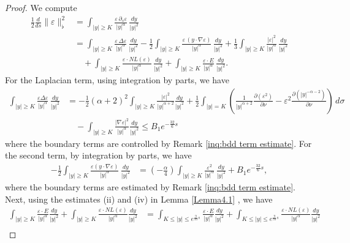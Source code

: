 \documentclass[11pt,reqno]{amsart}
\theoremstyle{definition}
\theoremstyle{bfremark}
\numberwithin{equation}{section}
\begin{document}
\begin{proof}
We compute
\begin{align*}
    \frac{1}{2}\frac{d}{ds}\|\varepsilon\|_{\flat}^2 &= \int_{|y| \geq K} \frac{\varepsilon\, \partial_s \varepsilon}{|y|^{\alpha}}\, \frac{dy}{|y|^2}\\
    &= \int_{|y| \geq K} \frac{\varepsilon\, \Delta \varepsilon}{|y|^{\alpha}}\, \frac{dy}{|y|^2} 
    - \frac{1}{2} \int_{|y| \geq K} \frac{\varepsilon\, (y \cdot \nabla \varepsilon)}{|y|^{\alpha}}\, \frac{dy}{|y|^2} 
    +\frac{1}{3} \int_{|y| \geq K} \frac{|\varepsilon|^2}{|y|^{\alpha}}\, \frac{dy}{|y|^2}\\
    & \quad+ \int_{|y| \geq K} \frac{\varepsilon \cdot NL(\varepsilon)}{|y|^{\alpha}}\, \frac{dy}{|y|^2}+\int_{|y| \geq K}\frac{ \varepsilon \cdot E}{|y|^{\alpha}}\,\frac{dy}{|y|^2}.
\end{align*}
For the Laplacian term, using integration by parts, we have
\begin{align*}
    \int_{|y| \geq K} \frac{\varepsilon \Delta \varepsilon}{|y|^{\alpha}}\, \frac{dy}{|y|^2} 
    &=-\frac{1}{2}(\alpha+2)^2\int_{|y| \geq K}\frac{|\varepsilon|^2}{|y|^{\alpha+2}}\frac{dy}{|y|^2}+\frac{1}{2}\int_{|y|=K}\left(\frac{1}{|y|^{\alpha+2}}\frac{\partial(\varepsilon^2)}{\partial \nu}-\varepsilon^2\frac{\partial(|y|^{-\alpha-2})}{\partial \nu}\right)\,d\sigma\\
    & \quad -\int_{|y| \geq K}\frac{|\nabla \varepsilon|^2}{|y|^{\alpha}}\frac{dy}{|y|^2} \leq B_1e^{-\frac{32}{6}s}
\end{align*}
where the boundary terms are controlled by Remark \ref{inq:bdd term estimate}. For the second term, by integration by parts, we have
\begin{align*}
    -\frac{1}{2} \int_{|y| \geq K} \frac{\varepsilon (y \cdot \nabla \varepsilon)}{|y|^{\alpha}}\,  \frac{dy}{|y|^2} 
    &= \left( -\frac{\alpha}{4} \right) \int_{|y| \geq K} \frac{\varepsilon^2}{|y|^{\alpha}}\,  \frac{dy}{|y|^2}+B_1 e^{-\frac{32}{6}s},
\end{align*}
where the boundary terms are estimated by Remark \ref{inq:bdd term estimate}. Next, using the estimates (ii) and (iv) in Lemma \ref{Lemma4.1} , we have
\begin{align*}
    \int_{|y| \geq K} \frac{\varepsilon \cdot E}{|y|^{\alpha}}\frac{dy}{|y|^2}+\int_{|y| \geq K} \frac{\varepsilon \cdot NL(\varepsilon)}{|y|^{\alpha}}\frac{dy}{|y|^2}&=\int_{K \leq |y| \leq e^{\frac{9}{33}s}} \frac{\varepsilon \cdot E}{|y|^{\alpha}}\frac{dy}{|y|^2}+\int_{K \leq |y| \leq e^{\frac{9}{33}s}} \frac{\varepsilon \cdot NL(\varepsilon)}{|y|^{\alpha}}\frac{dy}{|y|^2}\\

\end{align*}
\end{proof}
\end{document}
